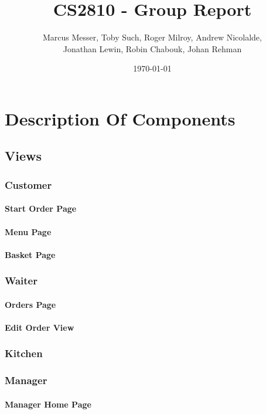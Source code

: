 \documentclass[12pt, twoside, a4paper]{report}
\title{CS2810 - Group Report}
\author{Marcus Messer, Toby Such, Roger Milroy, Andrew Nicolalde,\\
Jonathan Lewin, Robin Chabouk, Johan Rehman}
\date{\today}
\begin{document}
\maketitle
\pagestyle{fancy}
\fancyhf{}

\section*{Description Of Components}
\subsection*{Views}
\subsubsection*{Customer}
\paragraph{Start Order Page}

\paragraph{Menu Page}

\paragraph{Basket Page}

\subsubsection*{Waiter}
\paragraph{Orders Page}

\paragraph{Edit Order View}

\subsubsection*{Kitchen}

\subsubsection*{Manager}
\paragraph{Manager Home Page}
\end{document}
